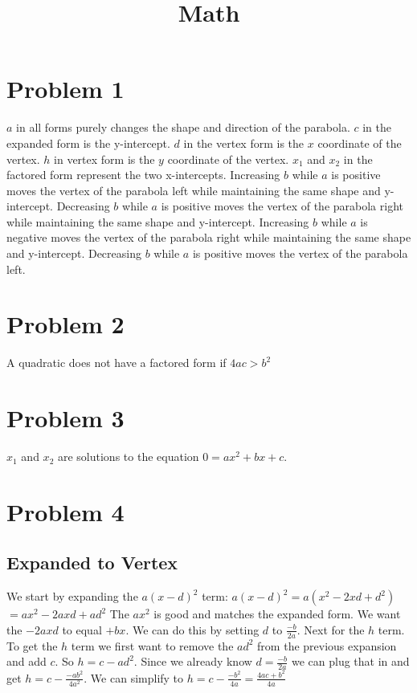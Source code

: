\documentclass[12pt, letterpaper, twoside]{article}
\title{Math}
\begin{document}
	
	\maketitle
\section{Problem 1}
$a$ in all forms purely changes the shape and direction of the parabola. $c$ in the expanded form is the y-intercept. $d$ in the vertex form is the $x$ coordinate of the vertex. $h$ in vertex form is the $y$ coordinate of the vertex. $x_1$ and $x_2$ in the factored form represent the two x-intercepts. Increasing $b$ while $a$ is positive moves the vertex of the parabola left while maintaining the same shape and y-intercept. Decreasing $b$ while $a$ is positive moves the vertex of the parabola right while maintaining the same shape and y-intercept. Increasing $b$ while $a$ is negative moves the vertex of the parabola right while maintaining the same shape and y-intercept. Decreasing $b$ while $a$ is positive moves the vertex of the parabola left.
\section{Problem 2}
A quadratic does not have a factored form if $4ac > b^2$
\section{Problem 3}
$x_1$ and $x_2$ are solutions to the equation $0 = ax^2 + bx + c$.
\section{Problem 4}
\subsection{Expanded to Vertex}
We start by expanding the $a(x-d)^2$ term:\newline
$a(x-d)^2 = a(x^2 - 2xd + d^2)$\newline
$= ax^2 - 2axd + ad^2$\newline
The $ax^2$ is good and matches the expanded form. We want the $-2axd$ to equal $+bx$. We can do this by setting $d$ to $\frac{-b}{2a}$.\newline
Next for the $h$ term. To get the $h$ term we first want to remove the $ad^2$ from the previous expansion and add $c$. So $h = c - ad^2$. Since we already know $d = \frac{-b}{2a}$ we can plug that in and get $h = c-\frac{-ab^2}{4a^2}$. We can simplify to $h = c-\frac{-b^2}{4a} = \frac{4ac+b^2}{4a}$
\end{document}
